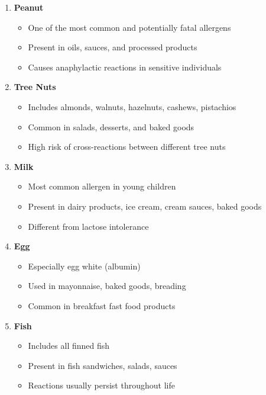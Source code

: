 \documentclass[12pt,a4paper]{article}
\begin{document}
\begin{enumerate}
    \item \textbf{Peanut}
    \begin{itemize}
        \item One of the most common and potentially fatal allergens
        \item Present in oils, sauces, and processed products
        \item Causes anaphylactic reactions in sensitive individuals
    \end{itemize}
    
    \item \textbf{Tree Nuts}
    \begin{itemize}
        \item Includes almonds, walnuts, hazelnuts, cashews, pistachios
        \item Common in salads, desserts, and baked goods
        \item High risk of cross-reactions between different tree nuts
    \end{itemize}
    
    \item \textbf{Milk}
    \begin{itemize}
        \item Most common allergen in young children
        \item Present in dairy products, ice cream, cream sauces, baked goods
        \item Different from lactose intolerance
    \end{itemize}
    
    \item \textbf{Egg}
    \begin{itemize}
        \item Especially egg white (albumin)
        \item Used in mayonnaise, baked goods, breading
        \item Common in breakfast fast food products
    \end{itemize}
    
    \item \textbf{Fish}
    \begin{itemize}
        \item Includes all finned fish
        \item Present in fish sandwiches, salads, sauces
        \item Reactions usually persist throughout life
    \end{itemize}
    

\end{enumerate}
\end{document}
